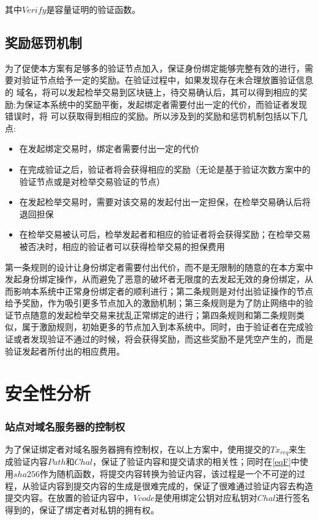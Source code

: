 其中$Verify$是容量证明的验证函数。



\subsection{奖励惩罚机制}

为了促使本方案有足够多的验证节点加入，保证身份绑定能够完整有效的进行，需要对验证节点给予一定的奖励。在验证过程中，如果发现存在未合理放置验证信息的 域名，将可以发起检举交易到区块链上，待交易确认后，其可以得到相应的奖励;为保证本系统中的奖励平衡，发起绑定者需要付出一定的代价，而验证者发现错误时，将 可以获取得到相应的奖励。所以涉及到的奖励和惩罚机制包括以下几点:

\begin{itemize}
	\item 在发起绑定交易时，绑定者需要付出一定的代价
	\item 在完成验证之后，验证者将会获得相应的奖励（无论是基于验证次数方案中的验证节点或是对检举交易验证的节点）
	\item 在发起检举交易时，需要对该交易的发起付出一定担保，在检举交易确认后将退回担保
	\item 在检举交易被认可后，检举发起者和相应的验证者将会获得奖励；在检举交易被否决时，相应的验证者可以获得检举交易的担保费用
\end{itemize}

第一条规则的设计让身份绑定者需要付出代价，而不是无限制的随意的在本方案中发起身份绑定操作，从而避免了恶意的破坏者无限度的去发起无效的身份绑定，从而影响本系统中正常身份绑定者的顺利进行；第二条规则是对付出验证操作的节点给予奖励，作为吸引更多节点加入的激励机制；第三条规则是为了防止网络中的验证节点随意的发起检举交易来扰乱正常绑定的进行；第四条规则和第二条规则类似，属于激励规则，初始更多的节点加入到本系统中。同时，由于验证者在完成验证或者发现验证不通过的时候，将会获得奖励，而这些奖励不是凭空产生的，而是验证发起者所付出的相应费用。




\section{安全性分析}

\subsubsection{站点对域名服务器的控制权}

为了保证绑定者对域名服务器拥有控制权，在以上方案中，使用提交的$Tx_{req}$来生成验证内容$Path$和$Chal$，保证了验证内容和提交请求的相关性；同时在\eqref{eqF}中使用$sha256$作为随机函数，将提交内容转换为验证内容，该过程是一个不可逆的过程，从验证内容到提交内容的生成是很难完成的，保证了很难通过验证内容去构造提交内容。在放置的验证内容中，$Vcode$是使用绑定公钥对应私钥对$Chal$进行签名得到的，保证了绑定者对私钥的拥有权。



